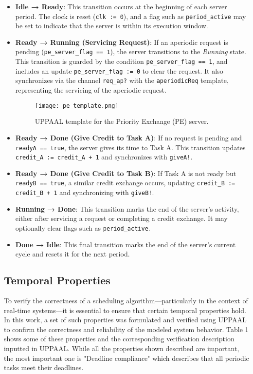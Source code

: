 \documentclass[conference]{IEEEtran}
\begin{document}
\begin{itemize}
    \item \textbf{Idle → Ready}:  
    This transition occurs at the beginning of each server period. The clock is reset (\texttt{clk := 0}), and a flag such as \texttt{period\_active} may be set to indicate that the server is within its execution window.

    \item \textbf{Ready → Running (Servicing Request)}:  
    If an aperiodic request is pending (\texttt{pe\_server\_flag == 1}), the server transitions to the \textit{Running} state. This transition is guarded by the condition \texttt{pe\_server\_flag == 1}, and includes an update \texttt{pe\_server\_flag := 0} to clear the request.  
    It also synchronizes via the channel \texttt{req\_ap?} with the \texttt{aperiodicReq} template, representing the servicing of the aperiodic request.

    \begin{figure*}[t]
    \centering
    \texttt{[image: pe\_template.png]}
    \caption{UPPAAL template for the Priority Exchange (PE) server.}
    \label{fig:pe_template}
  \end{figure*}


    \item \textbf{Ready → Done (Give Credit to Task A)}:  
    If no request is pending and \texttt{readyA == true}, the server gives its time to Task A. This transition updates \texttt{credit\_A := credit\_A + 1} and synchronizes with \texttt{giveA!}.

    \item \textbf{Ready → Done (Give Credit to Task B)}:  
    If Task A is not ready but \texttt{readyB == true}, a similar credit exchange occurs, updating \texttt{credit\_B := credit\_B + 1} and synchronizing with \texttt{giveB!}.

    \item \textbf{Running → Done}:  
    This transition marks the end of the server's activity, either after servicing a request or completing a credit exchange. It may optionally clear flags such as \texttt{period\_active}.

    \item \textbf{Done → Idle}:  
    This final transition marks the end of the server’s current cycle and resets it for the next period.
\end{itemize}

\subsection{Temporal Properties}
To verify the correctness of a scheduling algorithm—particularly in the context of real-time systems—it is essential to ensure that certain temporal properties hold. In this work, a set of such properties was formulated and verified using UPPAAL\cite{uppaal} to confirm the correctness and reliability of the modeled system behavior. Table 1 shows some of these properties and the corresponding verification description inputted in UPPAAL. While all the properties shown described are important, the most important one is "Deadline compliance" which describes that all periodic tasks meet their deadlines.
\end{document}
